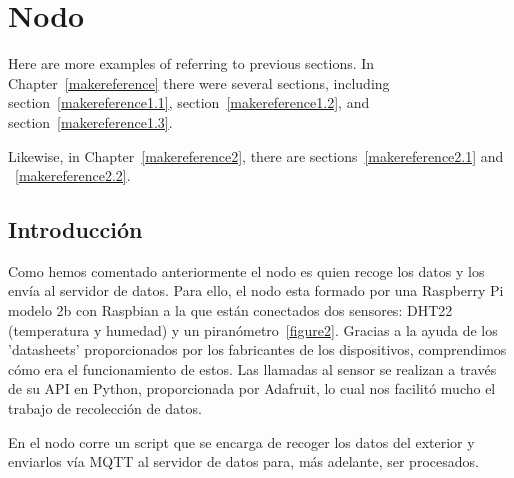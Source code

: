 \cleardoublepage

\chapter{Nodo}
\label{makereference4}

Here are more examples of referring to previous sections.  In
Chapter~\ref{makereference} there were several sections, including
section~\ref{makereference1.1}, section~\ref{makereference1.2},
and section~\ref{makereference1.3}.

Likewise, in Chapter~\ref{makereference2}, there are
sections~\ref{makereference2.1} and ~\ref{makereference2.2}.

\section{Introducción}
\label{makereference4.1}


Como hemos comentado anteriormente el nodo es quien recoge los datos y los envía al servidor de datos.
Para ello, el nodo esta formado por una Raspberry Pi modelo 2b con Raspbian a la que están conectados dos sensores: DHT22 (temperatura y humedad) y un piranómetro~\ref{figure2}.
Gracias a la ayuda de los 'datasheets' proporcionados por los fabricantes de los dispositivos, comprendimos cómo era el funcionamiento de estos. 
Las llamadas al sensor se realizan a través de su API en Python, proporcionada por Adafruit, lo cual nos facilitó mucho el trabajo de recolección de datos.

En el nodo corre un script que se encarga de recoger los datos del exterior y enviarlos vía MQTT al servidor de datos para, más adelante, ser procesados.


